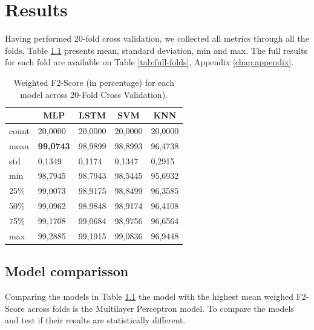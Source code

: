\newpage

\chapter{Results}
\label{chap:results}

Having performed 20-fold cross validation, we collected all metrics through all the folds. Table \ref{tab:cross-validation-results} presents mean, standard deviation, min and max. The full results for each fold are available on Table \ref{tab:full-folds}, Appendix \ref{chap:appendix}.

\begin{table}[!ht]
\centering
\caption{Weighted F2-Score (in percentage) for each model across 20-Fold Cross Validation).}
\begin{tabular}{l|l|l|l|l}
      & \multicolumn{1}{c|}{MLP} & \multicolumn{1}{c|}{LSTM} & \multicolumn{1}{c|}{SVM} & \multicolumn{1}{c}{KNN} \\ \hline
count & 20,0000                  & 20,0000                   & 20,0000                  & 20,0000                 \\ \hline
mean  & \textbf{99,0743}                  & 98,9899                   & 98,8993                  & 96,4738                 \\ \hline
std   & 0,1349                   & 0,1174                    & 0,1347                   & 0,2915                  \\ \hline
min   & 98,7945                  & 98,7943                   & 98,5445                  & 95,6932                 \\ \hline
25\%  & 99,0073                  & 98,9175                   & 98,8499                  & 96,3585                 \\ \hline
50\%  & 99,0962                  & 98,9848                   & 98,9174                  & 96,4108                 \\ \hline
75\%  & 99,1708                  & 99,0684                   & 98,9756                  & 96,6564                 \\ \hline
max   & 99,2885                  & 99,1915                   & 99,0836                  & 96,9448                
\end{tabular}
\label{tab:cross-validation-results}
\end{table}

\section{Model comparisson}\label{sec:comparisson}
Comparing the models in Table \ref{tab:cross-validation-results} the model with the highest mean weighed F2-Score across folds is the Multilayer Perceptron model. To compare the models and test if their results are statistically different. 

